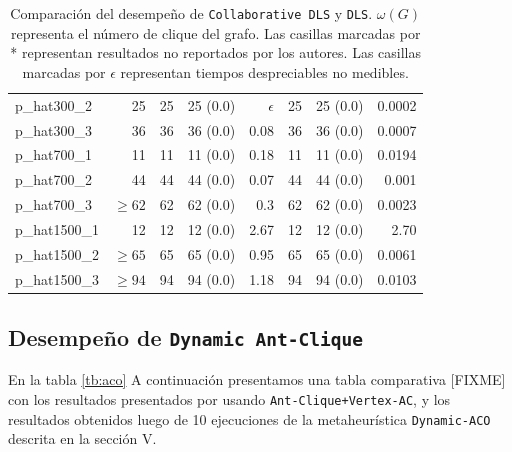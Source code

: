\documentclass[conference]{IEEEtran}
\begin{document}
\begin{center}
\begin{table}[ht]
{\begin{tabular}{lr|rlr|rlr}
 p\_hat300\_2      &           25  &    25  &  25 (0.0)           &   $\epsilon$  &    25  &  25 (0.0)        &      0.0002  \\
 p\_hat300\_3      &           36  &    36  &  36 (0.0)           &         0.08  &    36  &  36 (0.0)        &      0.0007  \\
 p\_hat700\_1      &           11  &    11  &  11 (0.0)           &         0.18  &    11  &  11 (0.0)        &      0.0194  \\
 p\_hat700\_2      &           44  &    44  &  44 (0.0)           &         0.07  &    44  &  44 (0.0)        &       0.001  \\
 p\_hat700\_3      &    $\geq 62$  &    62  &  62 (0.0)           &          0.3  &    62  &  62 (0.0)        &      0.0023  \\
 p\_hat1500\_1     &           12  &    12  &  12 (0.0)           &         2.67  &    12  &  12 (0.0)        &        2.70  \\
 p\_hat1500\_2     &    $\geq 65$  &    65  &  65 (0.0)           &         0.95  &    65  &  65 (0.0)        &      0.0061  \\
 p\_hat1500\_3     &    $\geq 94$  &    94  &  94 (0.0)           &         1.18  &    94  &  94 (0.0)        &      0.0103  \\
\hline
\end{tabular}}
\hfill{}
\caption{Comparación del desempeño de \texttt{Collaborative DLS} y
  \texttt{DLS}. $\omega(G)$ representa el número de
  clique del grafo. Las casillas marcadas por * representan resultados
no reportados por los autores. Las casillas marcadas por $\epsilon$
representan tiempos despreciables no medibles.}
\label{tb:dls}
\end{table}
\end{center}

\subsection{Desempeño de \texttt{Dynamic Ant-Clique}}
\label{sec:aco_res}

En la tabla \ref{tb:aco} A continuación presentamos una tabla comparativa [FIXME] con los resultados
presentados por \cite{aco2} usando \texttt{Ant-Clique+Vertex-AC}, y los
resultados obtenidos luego de 10 ejecuciones de la metaheurística
\texttt{Dynamic-ACO} descrita en la sección V.
\end{document}
